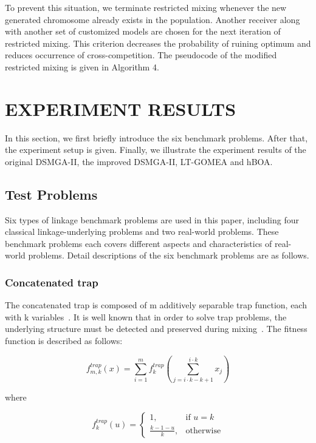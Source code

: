 \documentclass{sig-alternate-05-2015}
\begin{document}
To prevent this situation, we terminate restricted mixing whenever the new generated chromosome already exists in the population. Another receiver along with another set of customized models are chosen for the next iteration of restricted mixing. This criterion decreases the probability of ruining optimum and reduces occurrence of cross-competition. The pseudocode of the modified restricted mixing is given in Algorithm 4.








\section{EXPERIMENT RESULTS}
In this section, we first briefly introduce the six benchmark problems. After that, the experiment setup is given. Finally, we illustrate the experiment results of the original DSMGA-II, the improved DSMGA-II, LT-GOMEA and hBOA. 


\subsection{Test Problems}
Six types of linkage benchmark problems are used in this paper, including four classical linkage-underlying problems and two real-world problems. These benchmark problems each covers different aspects and characteristics of real-world problems. Detail descriptions of the six benchmark problems are as follows.


\subsubsection{Concatenated trap}
The concatenated trap is composed of m additively separable trap function, each with k variables~\cite{goldberg:deception}. It is well known that in order to solve trap problems, the underlying structure must be detected and preserved during mixing~\cite{pelikan:overlap}. The fitness function is described as follows:

\begin{displaymath}
f_{m,k}^{trap}(x) = \sum_{i=1}^{m} f_{k}^{trap} \left (\sum_{j = i\cdot k-k+1}^{i\cdot k} x_j\right )
\end{displaymath}

where

\begin{displaymath}
f_{k}^{trap}(u) = 
   \begin{cases}
    1, & \text{if $u=k$} \\
    \frac{k-1-u}{k}, & \text{otherwise}
	\end{cases}
\end{displaymath}
\end{document}
